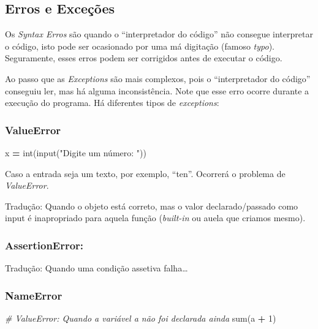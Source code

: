 \documentclass[]{book}
\newenvironment{Shaded}{\begin{snugshade}}{\end{snugshade}}
\newcommand{\DecValTok}[1]{\textcolor[rgb]{0.00,0.00,0.81}{#1}}
\newcommand{\StringTok}[1]{\textcolor[rgb]{0.31,0.60,0.02}{#1}}
\newcommand{\CommentTok}[1]{\textcolor[rgb]{0.56,0.35,0.01}{\textit{#1}}}
\newcommand{\OperatorTok}[1]{\textcolor[rgb]{0.81,0.36,0.00}{\textbf{#1}}}
\newcommand{\BuiltInTok}[1]{#1}
\newcommand{\NormalTok}[1]{#1}
\begin{document}
\subsection{Erros e Exceções}\label{erros-e-excecoes}

Os \emph{Syntax Erros} são quando o ``interpretador do código'' não
consegue interpretar o código, isto pode ser ocasionado por uma má
digitação (famoso \emph{typo}). Seguramente, esses erros podem ser
corrigidos antes de executar o código.

Ao passo que as \emph{Exceptions} são mais complexos, pois o
``interpretador do código'' conseguiu ler, mas há alguma inconsistência.
Note que esse erro ocorre durante a execução do programa. Há diferentes
tipos de \emph{exceptions}:

\subsubsection{ValueError}\label{valueerror}

\begin{Shaded}
\begin{Highlighting}[]
\NormalTok{x }\OperatorTok{=} \BuiltInTok{int}\NormalTok{(}\BuiltInTok{input}\NormalTok{(}\StringTok{"Digite um número: "}\NormalTok{))}
\end{Highlighting}
\end{Shaded}

Caso a entrada seja um texto, por exemplo, ``ten''. Ocorrerá o problema
de \emph{ValueError}.

Tradução: Quando o objeto está correto, mas o valor declarado/passado
como input é inapropriado para aquela função (\emph{built-in} ou auela
que criamos mesmo).

\subsubsection{AssertionError:}\label{assertionerror}

Tradução: Quando uma condição assetiva falha\ldots{}

\subsubsection{NameError}\label{nameerror}

\begin{Shaded}
\begin{Highlighting}[]
\CommentTok{# ValueError: Quando a variável a não foi declarada ainda}
\BuiltInTok{sum}\NormalTok{(a }\OperatorTok{+} \DecValTok{1}\NormalTok{)}
\end{Highlighting}
\end{Shaded}
\end{document}
